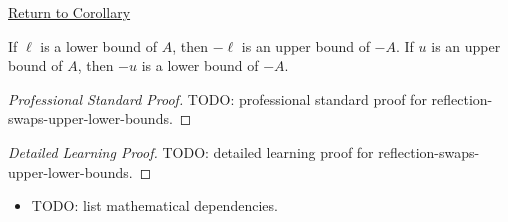 \newpage
{}
\label{prf:reflection-swaps-upper-lower-bounds}

\begin{remark*}[Return]
\hyperref[cor:reflection-swaps-upper-lower-bounds]{Return to Corollary}
\end{remark*}

\begin{corollary*}
If $\ell$ is a lower bound of $A$, then $-\ell$ is an upper bound of $-A$.
If $u$ is an upper bound of $A$, then $-u$ is a lower bound of $-A$.
\end{corollary*}

\begin{proof}[Professional Standard Proof]
\LRAProofBodyStart
TODO: professional standard proof for reflection-swaps-upper-lower-bounds.
\end{proof}

\begin{proof}[Detailed Learning Proof]
\LRAProofBodyStart
TODO: detailed learning proof for reflection-swaps-upper-lower-bounds.
\end{proof}

\begin{remark*}
\end{remark*}

\begin{dependencies}
\begin{itemize}
  \item TODO: list mathematical dependencies.
\end{itemize}
\end{dependencies}

\clearpage
